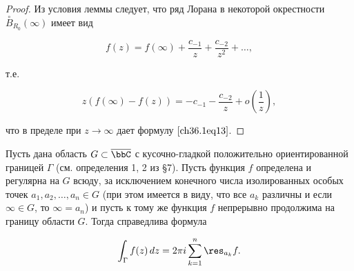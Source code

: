 \begin{proof}
Из условия леммы следует, что ряд Лорана в некоторой окрестности $\overset{\circ}{B}_{R_0}(\infty)$ имеет вид

$$
f(z) = f(\infty) + \frac{c_{-1}}{z} + \frac{c_{-2}}{z^2} + \ldots,
$$

т.е.

$$
z(f(\infty) - f(z)) = -c_{-1} - \frac{c_{-2}}{z} + o\left(\frac{1}{z}\right),
$$

что в пределе при $z \to \infty$ дает формулу $\eqref{ch36.1eq13}$.	

\end{proof}

\begin{thm}  \label{ch36.1T1}
Пусть дана область $G \subset \overline{\bbC}$ с кусочно-гладкой положительно ориентированной границей $\Gamma$ (см. определения 1, 2 из \S 7). Пусть функция $f$ определена и регулярна на $G$ всюду, за исключением конечного числа изолированных особых точек $a_1,a_2,\ldots,a_n \in G$ (при этом имеется в виду, что все $a_k$ различны и если $\infty \in G$, то $\infty = a_n$) и пусть к тому же функция $f$ непрерывно продолжима на границу области $G$. Тогда справедлива формула

\begin{equation} \label{ch36.1eq14}
\int_\Gamma f(z) \,dz = 2 \pi i \sum_{k = 1}^{n} \res_{a_k} f.
\end{equation}

\end{thm}

